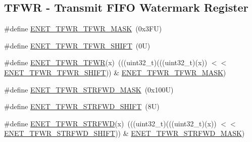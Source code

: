 \subsection*{T\+F\+WR -\/ Transmit F\+I\+FO Watermark Register}
\begin{DoxyCompactItemize}
\item 
\#define \mbox{\hyperlink{group___e_n_e_t___register___masks_gabf947dfd1da7311bb46602d7415a343d}{E\+N\+E\+T\+\_\+\+T\+F\+W\+R\+\_\+\+T\+F\+W\+R\+\_\+\+M\+A\+SK}}~(0x3\+F\+U)
\item 
\#define \mbox{\hyperlink{group___e_n_e_t___register___masks_ga20649e66e27490be23302b4c87e979b8}{E\+N\+E\+T\+\_\+\+T\+F\+W\+R\+\_\+\+T\+F\+W\+R\+\_\+\+S\+H\+I\+FT}}~(0\+U)
\item 
\#define \mbox{\hyperlink{group___e_n_e_t___register___masks_ga577c730841ebdcb31dad8bf4a8d864bb}{E\+N\+E\+T\+\_\+\+T\+F\+W\+R\+\_\+\+T\+F\+WR}}(x)~(((uint32\+\_\+t)(((uint32\+\_\+t)(x)) $<$$<$ \mbox{\hyperlink{group___e_n_e_t___register___masks_ga20649e66e27490be23302b4c87e979b8}{E\+N\+E\+T\+\_\+\+T\+F\+W\+R\+\_\+\+T\+F\+W\+R\+\_\+\+S\+H\+I\+FT}})) \& \mbox{\hyperlink{group___e_n_e_t___register___masks_gabf947dfd1da7311bb46602d7415a343d}{E\+N\+E\+T\+\_\+\+T\+F\+W\+R\+\_\+\+T\+F\+W\+R\+\_\+\+M\+A\+SK}})
\item 
\#define \mbox{\hyperlink{group___e_n_e_t___register___masks_gafbad9065556d81ffdbabd31915eb15b9}{E\+N\+E\+T\+\_\+\+T\+F\+W\+R\+\_\+\+S\+T\+R\+F\+W\+D\+\_\+\+M\+A\+SK}}~(0x100\+U)
\item 
\#define \mbox{\hyperlink{group___e_n_e_t___register___masks_ga4b3c1b7265098b5395df3ed3679058a0}{E\+N\+E\+T\+\_\+\+T\+F\+W\+R\+\_\+\+S\+T\+R\+F\+W\+D\+\_\+\+S\+H\+I\+FT}}~(8\+U)
\item 
\#define \mbox{\hyperlink{group___e_n_e_t___register___masks_gafb8456e0b24289107e8d85911cb5b4af}{E\+N\+E\+T\+\_\+\+T\+F\+W\+R\+\_\+\+S\+T\+R\+F\+WD}}(x)~(((uint32\+\_\+t)(((uint32\+\_\+t)(x)) $<$$<$ \mbox{\hyperlink{group___e_n_e_t___register___masks_ga4b3c1b7265098b5395df3ed3679058a0}{E\+N\+E\+T\+\_\+\+T\+F\+W\+R\+\_\+\+S\+T\+R\+F\+W\+D\+\_\+\+S\+H\+I\+FT}})) \& \mbox{\hyperlink{group___e_n_e_t___register___masks_gafbad9065556d81ffdbabd31915eb15b9}{E\+N\+E\+T\+\_\+\+T\+F\+W\+R\+\_\+\+S\+T\+R\+F\+W\+D\+\_\+\+M\+A\+SK}})
\end{DoxyCompactItemize}
